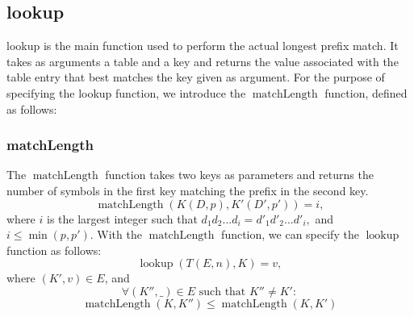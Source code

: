 \documentclass{article}
\DeclareMathOperator{\matchlength}{matchLength}
\DeclareMathOperator{\min}{min}
\DeclareMathOperator{\lookup}{lookup}
\begin{document}
\subsection{lookup}
lookup is the main function used to perform the actual longest prefix match. It
takes as arguments a table and a key and returns the value associated with the
table entry that best matches the key given as argument. For the purpose of
specifying the lookup function, we introduce the $\matchlength$ function, defined
as follows:
\subsubsection{matchLength}
The $\matchlength$ function takes two keys as parameters and returns the number of
symbols in the first key matching the prefix in the second key.
\[
    \matchlength(K(D, p), K'(D', p')) = i,
\]
where $i$ is the largest integer such that
\(
d_1d_2...d_i = d'_1d'_2...d'_i,
\)
and $i \leq \min(p, p')$. \newline \newline
With the $\matchlength$ function, we can specify the $\lookup$ function as
follows:
\[
    \lookup(T(E, n), K) = v,
\]
where $(K', v) \in E$, and
\[
    \forall (K'', \_) \in E \text{ such that } K'' \neq K' :
\]
\[
    \matchlength(K, K'') \leq \matchlength(K, K')
\]
\end{document}
